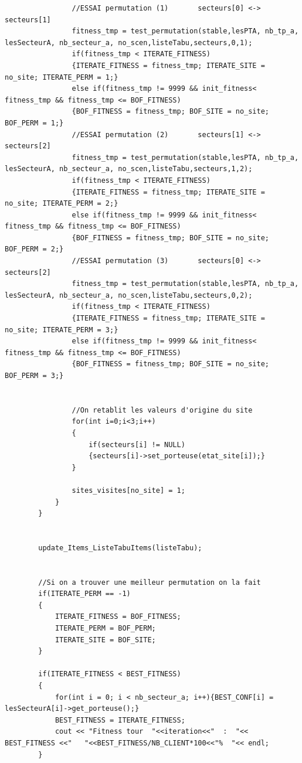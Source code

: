 \documentclass[a4paper, 11pt]{report}
\begin{document}
\begin{appendices}
\begin{lstlisting}
                //ESSAI permutation (1)       secteurs[0] <-> secteurs[1]
                fitness_tmp = test_permutation(stable,lesPTA, nb_tp_a, lesSecteurA, nb_secteur_a, no_scen,listeTabu,secteurs,0,1);
                if(fitness_tmp < ITERATE_FITNESS)
                {ITERATE_FITNESS = fitness_tmp; ITERATE_SITE = no_site; ITERATE_PERM = 1;}
                else if(fitness_tmp != 9999 && init_fitness< fitness_tmp && fitness_tmp <= BOF_FITNESS)
                {BOF_FITNESS = fitness_tmp; BOF_SITE = no_site; BOF_PERM = 1;}
                //ESSAI permutation (2)       secteurs[1] <-> secteurs[2]
                fitness_tmp = test_permutation(stable,lesPTA, nb_tp_a, lesSecteurA, nb_secteur_a, no_scen,listeTabu,secteurs,1,2);
                if(fitness_tmp < ITERATE_FITNESS)
                {ITERATE_FITNESS = fitness_tmp; ITERATE_SITE = no_site; ITERATE_PERM = 2;}
                else if(fitness_tmp != 9999 && init_fitness< fitness_tmp && fitness_tmp <= BOF_FITNESS)
                {BOF_FITNESS = fitness_tmp; BOF_SITE = no_site; BOF_PERM = 2;}
                //ESSAI permutation (3)       secteurs[0] <-> secteurs[2]
                fitness_tmp = test_permutation(stable,lesPTA, nb_tp_a, lesSecteurA, nb_secteur_a, no_scen,listeTabu,secteurs,0,2);
                if(fitness_tmp < ITERATE_FITNESS)
                {ITERATE_FITNESS = fitness_tmp; ITERATE_SITE = no_site; ITERATE_PERM = 3;}
                else if(fitness_tmp != 9999 && init_fitness< fitness_tmp && fitness_tmp <= BOF_FITNESS)
                {BOF_FITNESS = fitness_tmp; BOF_SITE = no_site; BOF_PERM = 3;}


                //On retablit les valeurs d'origine du site
                for(int i=0;i<3;i++)
                {
                    if(secteurs[i] != NULL)
                    {secteurs[i]->set_porteuse(etat_site[i]);}
                }

                sites_visites[no_site] = 1;
            }
        }


        update_Items_ListeTabuItems(listeTabu);


        //Si on a trouver une meilleur permutation on la fait
        if(ITERATE_PERM == -1)
        {
            ITERATE_FITNESS = BOF_FITNESS;
            ITERATE_PERM = BOF_PERM;
            ITERATE_SITE = BOF_SITE;
        }

        if(ITERATE_FITNESS < BEST_FITNESS)
        {
            for(int i = 0; i < nb_secteur_a; i++){BEST_CONF[i] = lesSecteurA[i]->get_porteuse();}
            BEST_FITNESS = ITERATE_FITNESS;
            cout << "Fitness tour  "<<iteration<<"  :  "<< BEST_FITNESS <<"   "<<BEST_FITNESS/NB_CLIENT*100<<"%  "<< endl;
        }


\end{lstlisting}
\end{appendices}
\end{document}
